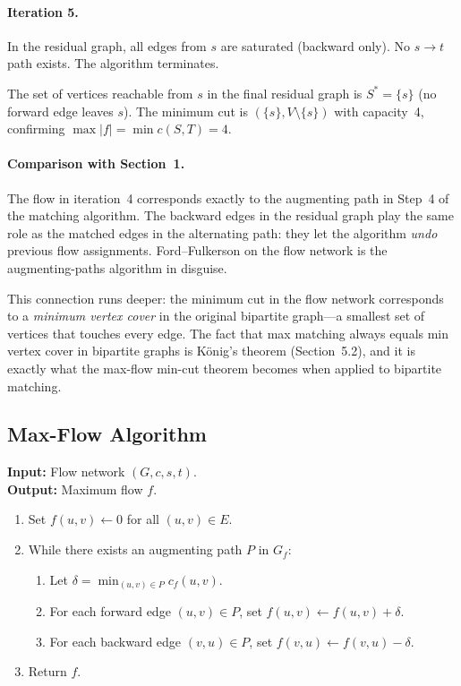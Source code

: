 \documentclass[11pt]{article}
\begin{document}
\paragraph{Iteration 5.}
In the residual graph, all edges from $s$ are saturated (backward
only).  No $s \to t$ path exists.  The algorithm terminates.

The set of vertices reachable from $s$ in the final residual
graph is $S^* = \{s\}$ (no forward edge leaves $s$).  The
minimum cut is $(\{s\}, V \setminus \{s\})$ with capacity~4,
confirming $\max |f| = \min c(S,T) = 4$.

\paragraph{Comparison with Section~1.}
The flow in iteration~4 corresponds exactly to the augmenting
path in Step~4 of the matching algorithm.  The backward edges in
the residual graph play the same role as the matched edges in the
alternating path: they let the algorithm \emph{undo} previous
flow assignments.  Ford--Fulkerson on the flow network is the
augmenting-paths algorithm in disguise.

This connection runs deeper: the minimum cut in the flow network
corresponds to a \emph{minimum vertex cover} in the original
bipartite graph---a smallest set of vertices that touches every
edge.  The fact that max matching always equals min vertex cover
in bipartite graphs is K\"onig's theorem (Section~5.2), and it is
exactly what the max-flow min-cut theorem becomes when applied to
bipartite matching.

\subsection{Max-Flow Algorithm}

\noindent\textbf{Input:} Flow network $(G, c, s, t)$.\\
\textbf{Output:} Maximum flow $f$.

\medskip
\begin{enumerate}
  \item Set $f(u,v) \gets 0$ for all $(u,v) \in E$.
  \item While there exists an augmenting path $P$ in $G_f$:
    \begin{enumerate}
      \item Let $\delta = \min_{(u,v) \in P} c_f(u,v)$.
      \item For each forward edge $(u,v) \in P$, set
            $f(u,v) \gets f(u,v) + \delta$.
      \item For each backward edge $(v,u) \in P$, set
            $f(v,u) \gets f(v,u) - \delta$.
    \end{enumerate}
  \item Return $f$.
\end{enumerate}
\end{document}
